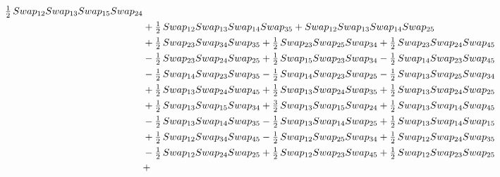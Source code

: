 \documentclass[10pt,a4paper]{amsart}
\begin{document}
\begin{align*}
        \tfrac12\,\textnormal{Swap}_{12} \textnormal{Swap}_{13} \textnormal{Swap}_{15} \textnormal{Swap}_{24}\\ & + \tfrac12\,\textnormal{Swap}_{12} \textnormal{Swap}_{13} \textnormal{Swap}_{14} \textnormal{Swap}_{35} + \textnormal{Swap}_{12} \textnormal{Swap}_{13} \textnormal{Swap}_{14} \textnormal{Swap}_{25}\\ & +
        \tfrac12\,\textnormal{Swap}_{23} \textnormal{Swap}_{34} \textnormal{Swap}_{35} + \tfrac12\,\textnormal{Swap}_{23} \textnormal{Swap}_{25} \textnormal{Swap}_{34} + \tfrac12\,\textnormal{Swap}_{23} \textnormal{Swap}_{24} \textnormal{Swap}_{45}\\ & - \tfrac12\,\textnormal{Swap}_{23} \textnormal{Swap}_{24} \textnormal{Swap}_{25} +
        \tfrac12\,\textnormal{Swap}_{15} \textnormal{Swap}_{23} \textnormal{Swap}_{34} - \tfrac12\,\textnormal{Swap}_{14} \textnormal{Swap}_{23} \textnormal{Swap}_{45}\\ & - \tfrac12\,\textnormal{Swap}_{14} \textnormal{Swap}_{23} \textnormal{Swap}_{35} - \tfrac12\,\textnormal{Swap}_{14} \textnormal{Swap}_{23} \textnormal{Swap}_{25} -
        \tfrac12\,\textnormal{Swap}_{13} \textnormal{Swap}_{25} \textnormal{Swap}_{34}\\ & + \tfrac12\,\textnormal{Swap}_{13} \textnormal{Swap}_{24} \textnormal{Swap}_{45} + \tfrac12\,\textnormal{Swap}_{13} \textnormal{Swap}_{24} \textnormal{Swap}_{35} + \tfrac12\,\textnormal{Swap}_{13} \textnormal{Swap}_{24} \textnormal{Swap}_{25}\\ & +
        \tfrac12\,\textnormal{Swap}_{13} \textnormal{Swap}_{15} \textnormal{Swap}_{34} + \tfrac32\,\textnormal{Swap}_{13} \textnormal{Swap}_{15} \textnormal{Swap}_{24} + \tfrac12\,\textnormal{Swap}_{13} \textnormal{Swap}_{14} \textnormal{Swap}_{45}\\ & - \tfrac12\,\textnormal{Swap}_{13} \textnormal{Swap}_{14} \textnormal{Swap}_{35} -
        \tfrac12\,\textnormal{Swap}_{13} \textnormal{Swap}_{14} \textnormal{Swap}_{25} + \tfrac12\,\textnormal{Swap}_{13} \textnormal{Swap}_{14} \textnormal{Swap}_{15}\\ & + \tfrac12\,\textnormal{Swap}_{12} \textnormal{Swap}_{34} \textnormal{Swap}_{45} - \tfrac12\,\textnormal{Swap}_{12} \textnormal{Swap}_{25} \textnormal{Swap}_{34} +
        \tfrac12\,\textnormal{Swap}_{12} \textnormal{Swap}_{24} \textnormal{Swap}_{35}\\ & - \tfrac12\,\textnormal{Swap}_{12} \textnormal{Swap}_{24} \textnormal{Swap}_{25} + \tfrac12\,\textnormal{Swap}_{12} \textnormal{Swap}_{23} \textnormal{Swap}_{45} + \tfrac12\,\textnormal{Swap}_{12} \textnormal{Swap}_{23} \textnormal{Swap}_{25}\\ & +

\end{align*}
\end{document}
